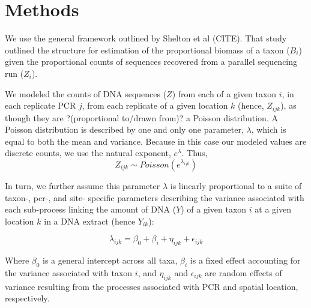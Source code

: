 \documentclass[11pt,letterpaper]{article} %
\begin{document}
\section*{Methods}
We use the general framework outlined by Shelton et al (CITE).
That study outlined the structure for estimation of the proportional biomass of a taxon ($B_i$) given the proportional counts of sequences recovered from a parallel sequencing run ($Z_i$).

We modeled the counts of DNA sequences ($Z$) from each of a given taxon $i$, in each replicate PCR $j$, from each replicate of a given location $k$ (hence, $Z_{ijk}$), as though they are ?(proportional to/drawn from)? a Poisson distribution. A Poisson distribution is described by one and only one parameter, $\lambda$, which is equal to both the mean and variance. Because in this case our modeled values are discrete counts, we use the natural exponent, $e^\lambda$. %
Thus,
\begin{equation}\label{some_cool_eqn_name}
	Z_{ijk} \sim Poisson(e^{\lambda_{ijk}})
\end{equation}

In turn, we further assume this parameter $\lambda$ is linearly proportional to a suite of taxon-, pcr-, and site- specific parameters describing the variance associated with each sub-process linking the amount of DNA ($Y$) of a given taxon $i$ at a given location $k$ in a DNA extract (hence $Y_{ik}$):

\begin{equation}\label{GLM}
	\lambda_{ijk} = \beta_0 + \beta_i + \eta_{ijk} + \epsilon_{ijk}
\end{equation}

Where $\beta_0$ is a general intercept across all taxa, $\beta_i$ is a fixed effect accounting for the variance associated with taxon $i$, and $\eta_{ijk}$ and $\epsilon_{ijk}$ are random effects of variance resulting from the processes associated with PCR and spatial location, respectively.


%
\end{document}
